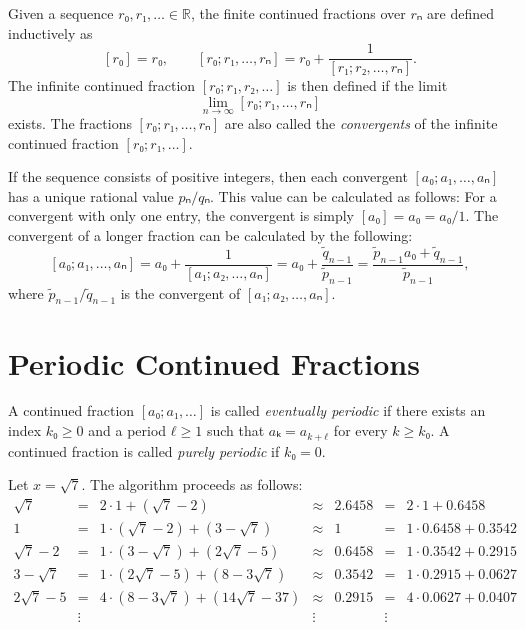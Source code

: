 \begin{definition}
  Given a sequence $r₀, r₁, … ∈ ℝ$, the finite continued
  fractions over $rₙ$ are defined inductively as
  \[
    [r₀] = r₀, \qquad
    [r₀; r₁, …, rₙ] = r₀ + \frac{1}{[r₁; r₂, …, rₙ]}.
  \]
  The infinite continued fraction $[r₀; r₁, r₂, …]$ is then defined if the limit
  \[
    \lim_{n → ∞} [r₀; r₁, …, rₙ]
  \]
  exists.
  The fractions $[r₀; r₁, …, rₙ]$ are also called the
  \emph{convergents} of the infinite continued fraction $[r₀; r₁, …]$.
\end{definition}

If the sequence consists of positive integers,
then each convergent $[a₀; a₁, …, aₙ]$ has a unique rational value $pₙ/qₙ$.
This value can be calculated as follows:
For a convergent with only one entry, the convergent is simply $[a₀] = a₀ = a₀/1$.
The convergent of a longer fraction can be calculated by the following:
\[
  [a₀; a₁, …, aₙ]
  = a₀ + \frac{1}{[a₁; a₂, …, aₙ]}
  = a₀ + \frac{\tilde q_{n-1}}{\tilde p_{n-1}}
  = \frac{\tilde p_{n-1} a₀ + \tilde q_{n-1}}{\tilde p_{n-1}},
\]
where $\tilde p_{n-1} / \tilde q_{n-1}$ is the convergent of $[a₁; a₂, …, aₙ]$.

\begin{example}
\end{example}

\section{Periodic Continued Fractions}

\begin{definition}
  A continued fraction $[a₀; a₁, …]$ is called \emph{eventually periodic}
  if there exists an index $k₀ ≥ 0$ and a period $ℓ ≥ 1$ such that $aₖ = a_{k+ℓ}$ for every $k ≥ k₀$.
  A continued fraction is called \emph{purely periodic} if $k₀ = 0$.
\end{definition}

\begin{example}
  Let $x = \sqrt{7}$.
  The algorithm proceeds as follows:
  \[
    \begin{array}{rclcrcl}
      \sqrt{7}      & = & 2 · 1               + (\sqrt{7} - 2)    & ≈ & 2.6458 & = & 2 · 1 + 0.6458      \\
      1             & = & 1 · (\sqrt{7} - 2)  + (3 - \sqrt{7})    & ≈ & 1      & = & 1 · 0.6458 + 0.3542 \\
      \sqrt{7} - 2  & = & 1 · (3 - \sqrt{7})  + (2\sqrt{7} - 5)   & ≈ & 0.6458 & = & 1 · 0.3542 + 0.2915 \\
      3 - \sqrt{7}  & = & 1 · (2\sqrt{7} - 5) + (8 - 3\sqrt{7})   & ≈ & 0.3542 & = & 1 · 0.2915 + 0.0627 \\
      2\sqrt{7} - 5 & = & 4 · (8 - 3\sqrt{7}) + (14\sqrt{7} - 37) & ≈ & 0.2915 & = & 4 · 0.0627 + 0.0407 \\
      & \vdots & & \vdots & & \vdots &
    \end{array}
  \]
\end{example}

